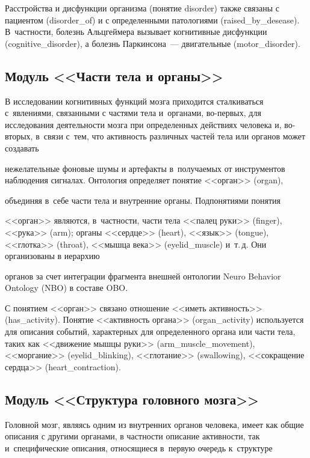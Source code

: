       

      Расстройства и дисфункции организма (понятие disorder) также связаны с пациентом (disorder\_of) и с определенными патологиями (raised\_by\_desease). В~частности, болезнь Альцгеймера вызывает когнитивные дисфункции (cognitive\_disorder), а болезнь Паркинсона~--- двигательные (motor\_disorder).



\subsection{Модуль <<Части тела и органы>>}



      В исследовании когнитивных функций мозга приходится сталкиваться с~явлениями, связанными с частями тела и~органами, во-первых, для исследования деятельности мозга при определенных действиях человека и, во-вторых, в~связи с~тем, что активность различных частей тела или органов может создавать 

нежелательные фоновые шумы и артефакты в~получаемых от инструментов наблюдения сигналах. Онтология определяет понятие <<орган>> (organ), 

объединяя в~себе части тела и внутренние органы. Подпонятиями понятия 

<<орган>> являются, в~частности, части тела <<палец руки>> (finger), <<рука>> (arm); органы <<сердце>> (heart), <<язык>> (tongue), <<глотка>> (throat), <<мышца века>> (eyelid\_muscle) и~т.\,д. Они организованы в иерархию 

органов за счет интеграции фрагмента внешней онтологии Neuro Behavior Ontology (NBO) в составе OBO.

      

      С понятием <<орган>> связано отношение <<иметь активность>> (has\_activity). Понятие <<активность органа>> (organ\_activity) используется для описания событий, характерных для определенного органа или части тела, таких как <<движение мышцы руки>> (arm\_muscle\_movement), <<моргание>> (eyelid\_blinking), <<глотание>> (swallowing), <<сокращение сердца>> (heart\_contraction). 



\subsection{Модуль <<Структура головного мозга>>}



      Головной мозг, являясь одним из внутренних органов человека, имеет как общие описания с другими органами, в частности описание активности, так и~специфические описания, относящиеся в~первую очередь к~структуре 

